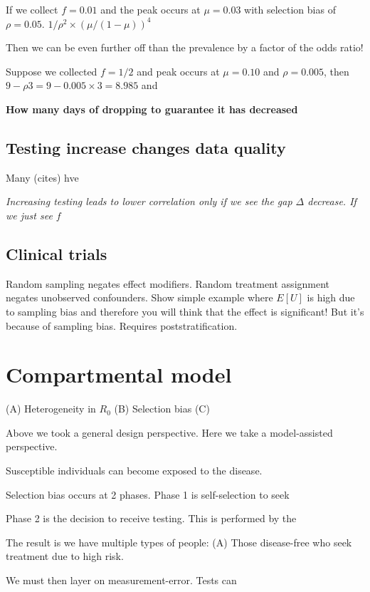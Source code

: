 \documentclass[12pt]{article}
\numberwithin{equation}{section}
\theoremstyle{plain}
\begin{document}
If we collect $f = 0.01$ and the peak occurs at $\mu = 0.03$ with selection bias of $\rho = 0.05$. $1/\rho^2 \times (\mu/(1-\mu))^4$

Then we can be even further off than the prevalence by a factor of the odds ratio!

Suppose we collected $f=1/2$ and peak occurs at $\mu = 0.10$ and $\rho = 0.005$, then $9-\rho 3 = 9 - 0.005 \times 3 = 8.985$ and

{\bf How many days of dropping to guarantee it has decreased}

\subsection{Testing increase changes data quality}

Many (cites) hve

\emph{Increasing testing leads to lower correlation only if we see the gap $\Delta$ decrease.  If we just see $f$ }

\subsection{Clinical trials}

Random sampling negates effect modifiers.  Random treatment assignment negates unobserved confounders.  Show simple example where $E[U]$ is high due to sampling bias and therefore you will think that the effect is significant! But it's because of sampling bias. Requires poststratification.

\section{Compartmental model}

(A) Heterogeneity in $R_0$
(B) Selection bias
(C)

Above we took a general design perspective.  Here we take a model-assisted perspective.

Susceptible individuals can become exposed to the disease.

Selection bias occurs at 2 phases. Phase 1 is self-selection to seek

Phase 2 is the decision to receive testing.  This is performed by the

The result is we have multiple types of people: (A) Those disease-free who seek treatment due to high risk.

We must then layer on measurement-error.  Tests can
\end{document}
